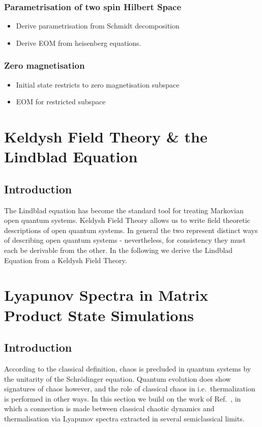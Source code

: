 \documentclass{article}
\begin{document}
\subsubsection{Parametrisation of two spin Hilbert Space}
%
\begin{itemize}
    \item Derive parametrisation from Schmidt decomposition
    \item Derive EOM from heisenberg equations.
\end{itemize}
%
\subsubsection{Zero magnetisation}
%
\begin{itemize}
    \item Initial state restricts to zero magnetisation subspace
    \item EOM for restricted subspace
\end{itemize}




\section{Keldysh Field Theory \& the Lindblad Equation}\label{sec:open}
%
\subsection{Introduction}
The Lindblad equation has become the standard tool for treating Markovian open quantum systems. 
Keldysh Field Theory allows us to write field theoretic descriptions of open quantum systems. 
In general the two represent distinct ways of describing open quantum systems - nevertheless, for consistency they must each be derivable from the other. 
In the following we derive the Lindblad Equation from a Keldysh Field Theory.
%
\section{Lyapunov Spectra in Matrix Product State Simulations}\label{sec:chaos}
%
\subsection{Introduction}
According to the classical definition, chaos is precluded in quantum systems by the unitarity of the Schr\"odinger equation.
Quantum evolution does show signatures of chaos however, and the role of classical chaos in i.e.\ thermalization is performed in other ways.
In this section we build on the work of Ref.~\cite{Andrew}, in which a connection is made between classical chaotic dynamics and thermalisation via Lyapunov spectra extracted in several semiclassical limits.
\end{document}

